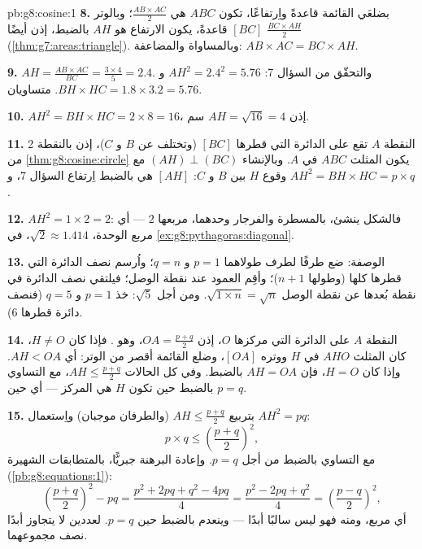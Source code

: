 \begin{solution}{pb:g8:cosine:1}
\textbf{8.} بضلعَي القائمة قاعدةً واِرتفاعًا، تكون  $ABC$
هي $\frac{AB \times AC}{2}$؛ وبالوتر $[BC]$ قاعدةً،
يكون الارتفاع هو $AH$ بالضبط، إذن  أيضًا
$\frac{BC \times AH}{2}$ (\cref{thm:g7:areas:triangle}). وبالمساواة
والمضاعفة: $AB \times AC = BC \times AH$.

\textbf{9.} $AH = \frac{AB \times AC}{BC} = \frac{3 \times 4}{5}
= 2.4$. والتحقّق من السؤال 7:
$AH^2 = 2.4^2 = 5.76$ و
$BH \times HC = 1.8 \times 3.2 = 5.76$. متساويان.

\textbf{10.} $AH^2 = BH \times HC = 2 \times 8 = 16$، إذن
$AH = \sqrt{16} = 4$ سم.

\textbf{11.} النقطة $A$ تقع على الدائرة التي قطرها $[BC]$
(وتختلف عن $B$ و $C$)، إذن بالنقطة 2 من
\cref{thm:g8:cosine:circle} يكون المثلث $ABC$  في
$A$. وبالإنشاء $(AH) \perp (BC)$ مع وقوع $H$ بين $B$ و
$C$:  $[AH]$ هي بالضبط اِرتفاع السؤال 7،
و $AH^2 = BH \times HC = p \times q$.

\textbf{12.} $AH^2 = 1 \times 2 = 2$: فالشكل ينشئ، بالمسطرة
والفرجار وحدهما،  مربعها $2$ --- أي
 مربع الوحدة، $\sqrt2 \approx 1.414$، في
\cref{ex:g8:pythagoras:diagonal}.

\textbf{13.} الوصفة: ضع طرفًا لطرف  طولاهما
$p = 1$ و $q = n$؛ واُرسم نصف الدائرة التي قطرها
 كلها (وطولها $n + 1$)؛ وأقِم العمود عند
نقطة الوصل؛ فيلتقي نصف الدائرة في نقطة
بُعدها عن نقطة الوصل $\sqrt{1 \times n} = \sqrt n$. ومن أجل
$\sqrt5$: خذ $p = 1$ و $q = 5$ (فنصف دائرة قطرها
$6$).

\textbf{14.} النقطة $A$ على الدائرة التي مركزها $O$، إذن
$OA = \frac{p+q}{2}$، وهو . فإذا كان $H \neq O$، كان المثلث
$AHO$  في $H$ ووتره $[OA]$، وضلع القائمة
أقصر من الوتر: أي $AH < OA$. وإذا كان $H = O$، فإن
$AH = OA$ بالضبط. وفي كل الحالات $AH \leq \frac{p+q}{2}$، مع
التساوي بالضبط حين تكون $H$ هي المركز --- أي حين
$p = q$.

\textbf{15.} بتربيع $AH \leq \frac{p+q}{2}$ (والطرفان
موجبان) واِستعمال $AH^2 = pq$:
\[
p \times q \leq \left(\frac{p+q}{2}\right)^2 ,
\]
مع التساوي بالضبط من أجل $p = q$. وإعادة البرهنة جبريًّا، بالمتطابقات
الشهيرة (\cref{pb:g8:equations:1}):
\[
\left(\frac{p+q}{2}\right)^2 - pq
= \frac{p^2 + 2pq + q^2 - 4pq}{4}
= \frac{p^2 - 2pq + q^2}{4}
= \left(\frac{p-q}{2}\right)^2 ,
\]
أي مربع، ومنه فهو ليس سالبًا أبدًا --- وينعدم بالضبط حين
$p = q$.  لعددين لا يتجاوز أبدًا
نصف مجموعهما.
\end{solution}
